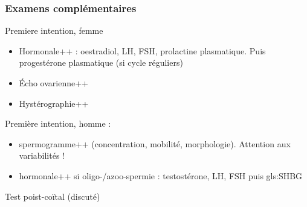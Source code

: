 \documentclass[11pt]{article}
\begin{document}
\subsubsection{Examens complémentaires}
\label{sec:orgd2f44e1}
Premiere intention, femme
\begin{itemize}
\item Hormonale++ : oestradiol, LH, FSH, prolactine plasmatique. Puis progestérone plasmatique (si cycle réguliers)
\item Écho ovarienne++
\item Hystérographie++
\end{itemize}
Première intention, homme :
\begin{itemize}
\item spermogramme++ (concentration, mobilité, morphologie). Attention aux variabilités !
\item hormonale++ si oligo-/azoo-spermie : testostérone, LH, FSH puis gls:SHBG
\end{itemize}
Test poist-coïtal (discuté)
\end{document}
